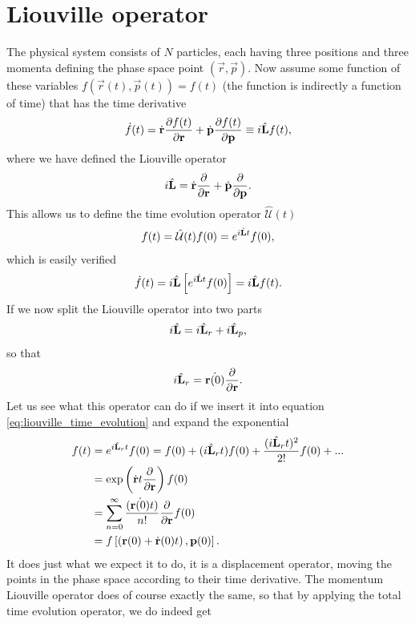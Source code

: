 \section{Liouville operator}
\label{sec:liouville_operator}
The physical system consists of $N$ particles, each having three positions and three momenta defining the phase space point $(\vec r, \vec p)$. Now assume some function of these variables $f(\vec r(t), \vec p(t)) = f(t)$ (the function is indirectly a function of time) that has the time derivative
\begin{align}
	\dot f(t) = \dot {\mathbf r}\frac{\partial f(t)}{\partial \mathbf r} + \dot {\mathbf p}\frac{\partial f(t)}{\partial \mathbf p} \equiv i\hat{\mathbf L} f(t),
\end{align}
where we have defined the Liouville operator
\begin{align}
	i\hat{\mathbf L} = \dot{\mathbf r}\frac{\partial }{\partial \mathbf r} + \dot{\mathbf p}\frac{\partial }{\partial \mathbf p}.
\end{align}
This allows us to define the time evolution operator $\hat{\mathcal U}(t)$
\begin{align}
	\label{eq:liouville_time_evolution}
	f(t) = \hat{\mathcal U}(t)f(0) = e^{i\hat{\mathbf L} t}f(0),
\end{align}
which is easily verified
\begin{align}
	\dot f(t) = i\hat{\mathbf L} \left[e^{i\hat{\mathbf L} t}f(0)\right] = i\hat{\mathbf L} f(t).
\end{align}
If we now split the Liouville operator into two parts
\begin{align}
	i\hat{\mathbf L} = i\hat{\mathbf L}_r + i\hat{\mathbf L}_p,
\end{align}
so that
\begin{align}
	i\hat{\mathbf L}_r = \dot{\mathbf r(0)}\frac{\partial }{\partial \mathbf r}.
\end{align}
Let us see what this operator can do if we insert it into equation \eqref{eq:liouville_time_evolution} and expand the exponential
\begin{align}
	f(t) &= e^{i\hat{\mathbf L}_r t} f(0) = f(0) + (i\hat{\mathbf L}_r t) f(0) + \frac{(i\hat{\mathbf L}_r t)^2}{2!} f(0) + ...\\
	&= \exp\left(\dot{\mathbf r}t\frac{\partial }{\partial \mathbf r}\right)f(0)\\
	&= \sum_{n=0}^\infty \frac{(\dot{\mathbf r(0)}t)}{n!}\frac{\partial}{\partial \mathbf r} f(0)\\
	&= f\left[\left(\mathbf r(0) + \dot{\mathbf r}(0)t\right), \mathbf p(0)\right].
\end{align}
It does just what we expect it to do, it is a displacement operator, moving the points in the phase space according to their time derivative. The momentum Liouville operator does of course exactly the same, so that by applying the total time evolution operator, we do indeed get

